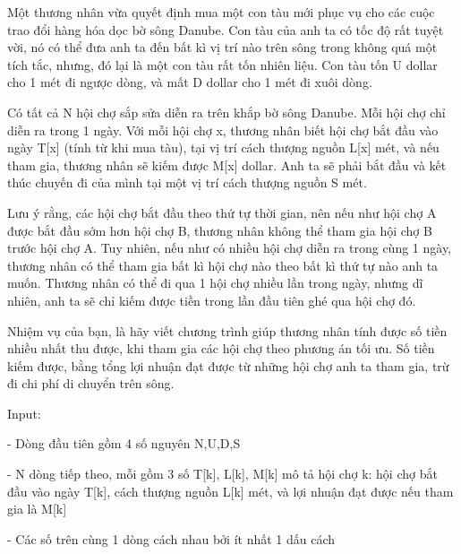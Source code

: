 



   Một thương nhân vừa quyết định mua một con tàu mới phục vụ cho các cuộc trao đổi hàng hóa dọc bờ sông Danube. Con tàu của anh ta có tốc độ rất tuyệt vời, nó có thể đưa anh ta đến bất kì vị trí nào trên sông trong không quá một tích tắc, nhưng, đó lại là một con tàu rất tốn nhiên liệu. Con tàu tốn U dollar cho 1 mét đi ngược dòng, và mất D dollar cho 1 mét đi xuôi dòng.   





   Có tất cả N hội chợ sắp sửa diễn ra trên khắp bờ sông Danube. Mỗi hội chợ chỉ diễn ra trong 1 ngày. Với mỗi hội chợ x, thương nhân biết hội chợ bắt đầu vào ngày T[x] (tính từ khi mua tàu), tại vị trí cách thượng nguồn L[x] mét, và nếu tham gia, thương nhân sẽ kiếm được M[x] dollar. Anh ta sẽ phải bắt đầu và kết thúc chuyến đi của mình tại một vị trí cách thượng nguồn S mét.   





   Lưu ý rằng, các hội chợ bắt đầu theo thứ tự thời gian, nên nếu như hội chợ A được bắt đầu sớm hơn hội chợ B, thương nhân không thể tham gia hội chợ B trước hội chợ A. Tuy nhiên, nếu như có nhiều hội chợ diễn ra trong cùng 1 ngày, thương nhân có thể tham gia bất kì hội chợ nào theo bất kì thứ tự nào anh ta muốn. Thương nhân có thể đi qua 1 hội chợ nhiều lần trong ngày, nhưng dĩ nhiên, anh ta sẽ chỉ kiếm được tiền trong lần đầu tiên ghé qua hội chợ đó.   





   Nhiệm vụ của bạn, là hãy viết chương trình giúp thương nhân tính được số tiền nhiều nhất thu được, khi tham gia các hội chợ theo phương án tối ưu. Số tiền kiếm được, bằng tổng lợi nhuận đạt được từ những hội chợ anh ta tham gia, trừ đi chi phí di chuyển trên sông.   





   Input:   


   - Dòng đầu tiên gồm 4 số nguyên N,U,D,S   


   - N dòng tiếp theo, mỗi gồm 3 số T[k], L[k], M[k] mô tả hội chợ k: hội chợ bắt đầu vào ngày T[k], cách thượng nguồn L[k] mét, và lợi nhuận đạt được nếu tham gia là M[k]   


   - Các số trên cùng 1 dòng cách nhau bởi ít nhất 1 dấu cách   





